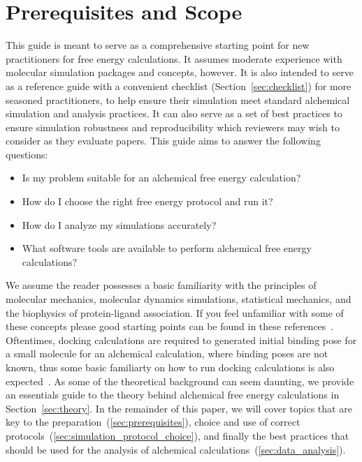 \documentclass[9pt,bestpractices]{livecoms}
\begin{document}
\section{Prerequisites and Scope}
\label{sec:pre}
This guide is meant to serve as a comprehensive starting point for new practitioners for free energy calculations.  It assumes moderate experience with molecular simulation packages and concepts, however.  It is also intended to serve as a reference guide with a convenient checklist (Section~\ref{sec:checklist}) for more seasoned practitioners, to help ensure their simulation meet standard alchemical simulation and analysis practices. It can also serve as a set of best practices to ensure simulation robustness and reproducibility which reviewers may wish to consider as they evaluate papers.
%
This guide aims to answer the following questions:
\begin{itemize}
    \item Is my problem suitable for an alchemical free energy calculation? 
    \item How do I choose the right free energy protocol and run it? 
    \item How do I analyze my simulations accurately? 
    \item What software tools are available to perform alchemical free energy calculations? 
\end{itemize}
%
We assume the reader possesses a basic familiarity with the principles of molecular mechanics, molecular dynamics simulations, statistical mechanics, and the biophysics of protein-ligand association. If you feel unfamiliar with some of these concepts please good starting points can be found in these references~\cite{braun2019best, grossfield2018best, klimovich2015guidelines, shirts2012best}. Oftentimes, docking calculations are required to generated initial binding pose for a small molecule for an alchemical calculation, where binding poses are not known, thus some basic familiarty on how to run docking calculations is also expected~\cite{grinter2014challenges}. 
%
As some of the theoretical background can seem daunting, we provide an essentials guide to the theory behind alchemical free energy calculations in Section~\ref{sec:theory}.
In the remainder of this paper, we will cover topics that are key to the preparation~(\ref{sec:prerequisites}), choice and use of correct protocols~(\ref{sec:simulation_protocol_choice}), and finally the best practices that should be used for the analysis of alchemical calculations~(\ref{sec:data_analysis}). 
\end{document}
